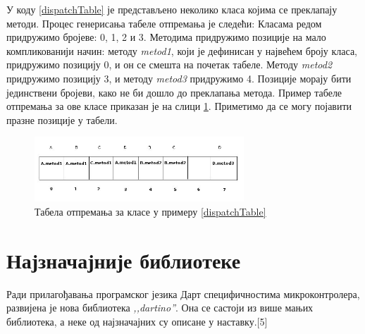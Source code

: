 \documentclass[12pt,oneside]{memoir}
\begin{document}
\begin{enumerate}
У коду \ref{dispatchTable} је представљено неколико класа којима се преклапају методи. Процес генерисања табеле отпремања је следећи: Класама редом придружимо бројеве: 0, 1, 2 и 3. Методима придружимо позиције на мало компликованији начин: методу \textit{metod1}, који је дефинисан у највећем броју класа, придружимо позицију 0, и он се смешта на почетак табеле. Методу \textit{metod2} придружимо позицију 3, и методу \textit{metod3} придружимо 4. Позиције морају бити јединствени бројеви, како не би дошло до преклапања метода. Пример табеле отпремања за ове класе приказан је на слици \ref{fig:otpremanje}. Приметимо да се могу појавити празне позиције у табели.\cite{Dartino}

\begin{figure}[!ht]
  \centering
  \includegraphics[width=0.7\textwidth]{otpremanje.jpg}
  \caption{Табела отпремања за класе у примеру \ref{dispatchTable}}
  \label{fig:otpremanje}
\end{figure}


\end{enumerate}

\section{Најзначајније библиотеке}
Ради прилагођавања програмског језика Дарт специфичностима микроконтролера, развијена је нова библиотека \textit{,,dartino''}. Она се састоји из више мањих библиотека, а неке од најзначајних су описане у наставку.[5]%
\end{document}
